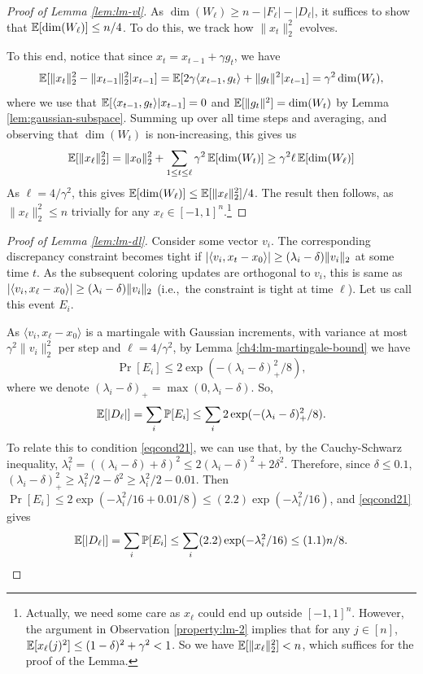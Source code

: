 \begin{proof}[Proof of Lemma \ref{lem:lm-vl}]
    As $\dim(W_\ell) \geq  n -  |F_\ell| - |D_{\ell}|$, it suffices to show that $\mathbb{E}[\dim(W_\ell)] \leq n/4$.
To do this, we track how $\|x_t\|_2^2$ evolves.

To this end, notice that since
 $x_t  = x_{t-1}+ \gamma g_t$, we have
\[\mathbb{E}[ \|x_t\|_2^2 - \|x_{t-1}\|_2^2 | x_{t-1}]  = \mathbb{E}[ 2 \gamma \langle x_{t-1}, g_t\rangle + \|g_t\|^2 | x_{t-1} ] = \gamma^2 \dim(W_t),\]
where we use that $\mathbb{E}[\langle x_{t-1}, g_t\rangle|x_{t-1}]=0$ and $\mathbb{E}[\|g_t\|^2 ] = \dim(W_t)$ by Lemma \ref{lem:gaussian-subspace}.
Summing up over all time steps and averaging, and observing that $\dim(W_t)$ is non-increasing, this gives  us
\[\mathbb{E}[\|x_\ell\|_2^2] = \|x_0\|_2^2 + \sum_{1 \leq t\leq \ell}  \gamma^2\,  \mathbb{E}[\dim(W_t)]  \geq  \gamma^2  \ell \, \mathbb{E}[ \dim(W_\ell)] \]
As $\ell = 4/\gamma^2$, this gives $\mathbb{E}[ \dim(W_\ell)] \leq \mathbb{E}[\|x_{\ell}\|_2^2]/4$. 
The result then follows, as $\|x_\ell\|_2^2 \leq n$ trivially for any $x_{\ell} \in [-1,1]^n$.\footnote{Actually, we need some care as $x_\ell$ could end up outside $[-1,1]^n$. However, the argument in Observation \ref{property:lm-2} implies that for any $j \in [n]$, $\mathbb{E}[x_\ell(j)^2] \leq (1-\delta)^2 + \gamma^2 < 1$. So we have $\mathbb{E}[\|x_{\ell}\|_2^2] < n$, which suffices for the proof of the Lemma.}
\end{proof}


\begin{proof}[Proof of Lemma \ref{lem:lm-dl}]
Consider some vector $v_i$. The corresponding discrepancy constraint becomes tight if $|\langle v_i, x_t-x_0\rangle| \geq (\lambda_i -\delta)\|v_i\|_2$ at some time $t$. As the subsequent coloring updates are orthogonal to $v_i$, this is same as $|\langle v_i, x_\ell-x_0\rangle| \geq (\lambda_i -\delta)\|v_i\|_2$ (i.e.,~the constraint is tight at time $\ell$). Let us call this event $E_i$.

As $\langle v_i,x_\ell -x_0\rangle $ is a martingale with Gaussian increments, with variance at most $\gamma^2 \|v_i\|_2^2$ per step and $\ell=4/\gamma^2$, by Lemma \ref{ch4:lm-martingale-bound} we have 
\[  \Pr[E_i] \leq 2 \exp(-(\lambda_i -\delta)_+^2/8),\]
     where we denote $(\lambda_i -\delta)_+ = \max(0,\lambda_i -\delta)$. So,
     \[ \mathbb{E} [ |D_\ell|] = \sum_i \mathbb{P}[E_i]  \leq \sum_i 2 \exp(-(\lambda_i -\delta)_+^2/8).\]
To relate this to condition \eqref{eqcond21}, we can use that, by the Cauchy-Schwarz inequality, 
\(
\lambda_i^2 = ((\lambda_i-\delta) + \delta)^2 \le 2(\lambda_i-\delta)^2 + 2\delta^2.
\)
Therefore, since $\delta \le 0.1$, $(\lambda_i -\delta)^2_+  \geq \lambda_i^2/2 -  \delta^2 \geq \lambda_i^2/2 - 0.01$.
Then $\Pr[E_i] \leq 2 \exp( -\lambda_i^2/16 + 0.01/8) \leq (2.2) \exp(-\lambda_i^2/16)$, and \eqref{eqcond21} gives
\[ \mathbb{E}[|D_\ell|] = \sum_i \mathbb{P}[E_i]  \leq \sum_i (2.2) \exp(-\lambda_i^2/16) \leq  (1.1) n/8. \qedhere\]
\end{proof}

